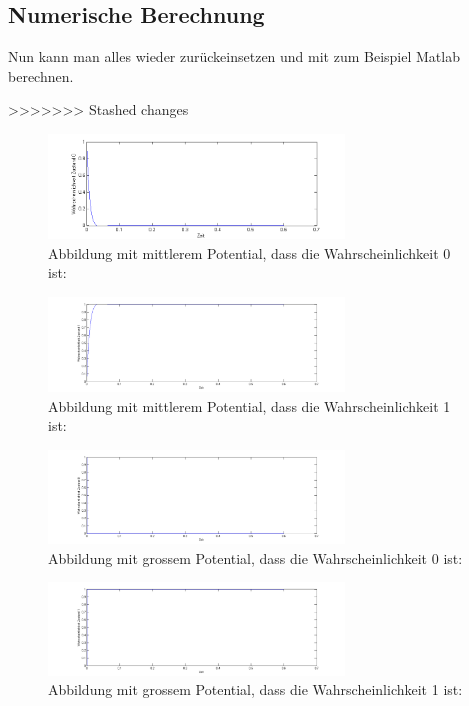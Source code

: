 \begin{refsection}
\subsection{Numerische Berechnung}
Nun kann man alles wieder zurückeinsetzen und mit zum Beispiel Matlab berechnen.

>>>>>>> Stashed changes

\begin{figure}
\centering
\includegraphics[width=0.7\textwidth]{flash/graphics/StandardZ0.png}
\caption{Abbildung mit mittlerem Potential, dass die Wahrscheinlichkeit 0 ist:
\label{skript:StandardZ0}}
\end{figure}
\begin{figure}
\centering
\includegraphics[width=0.7\textwidth]{flash/graphics/StandardZ1.png}
\caption{Abbildung mit mittlerem Potential, dass die Wahrscheinlichkeit 1 ist:
\label{skript:StandardZ1}}
\end{figure}

\begin{figure}
\centering
\includegraphics[width=0.7\textwidth]{flash/graphics/PotentialgrossZ0.png}
\caption{Abbildung mit grossem Potential, dass die Wahrscheinlichkeit 0 ist:
\label{skript:PotentialgrossZ0}}
\end{figure}
\begin{figure}
\centering
\includegraphics[width=0.7\textwidth]{flash/graphics/PotentialgrossZ1.png}
\caption{Abbildung mit grossem Potential, dass die Wahrscheinlichkeit 1 ist:
\label{skript:PotentialgrossZ1}}
\end{figure}


\end{refsection}
